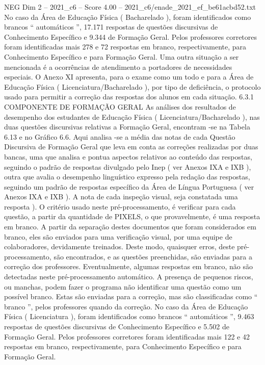 \begin{textsample}{NEG Dim 2 – 2021\_c6 – Score 4.00 – 2021\_c6/enade\_2021\_ef\_be61acbd52.txt}
No caso da Área de Educação Física ( Bacharelado ), foram identificados como brancos “ automáticos ”, 17.171 respostas de questões discursivas de Conhecimento Específico e 9.344 de Formação Geral.
Pelos professores corretores foram identificadas mais 278 e 72 respostas em branco, respectivamente, para Conhecimento Específico e para Formação Geral.
Uma outra situação a ser mencionada é a ocorrências de atendimento a portadores de necessidades especiais.
O Anexo XI apresenta, para o exame como um todo e para a Área de Educação Física ( Licenciatura/Bacharelado ), por tipo de deficiência, o protocolo usado para permitir a correção das respostas dos alunos em cada situação. 6.3.1 COMPONENTE DE FORMAÇÃO GERAL As análises dos resultados de desempenho dos estudantes de Educação Física ( Licenciatura/Bacharelado ), nas duas questões discursivas relativas a Formação Geral, encontram -se na Tabela 6.13 e no Gráfico 6.6.
Aqui analisa -se a média das notas de cada Questão Discursiva de Formação Geral que leva em conta as correções realizadas por duas bancas, uma que analisa e pontua aspectos relativos ao conteúdo das respostas, seguindo o padrão de respostas divulgado pelo Inep ( ver Anexos IXA e IXB ), outra que avalia o desempenho linguístico expresso pela redação das respostas, seguindo um padrão de respostas específico da Área de Língua Portuguesa ( ver Anexos IXA e IXB ).
A nota de cada inspeção visual, seja constatada uma resposta ).
O critério usado neste pré-processamento, é verificar para cada questão, a partir da quantidade de PIXELS, o que provavelmente, é uma resposta em branco.
A partir da separação destes documentos que foram considerados em branco, eles são enviados para uma verificação visual, por uma equipe de colaboradores, devidamente treinados.
Deste modo, quaisquer erros, deste pré-processamento, são encontrados, e as questões preenchidas, são enviadas para a correção dos professores.
Eventualmente, algumas respostas em branco, não são detectadas neste pré-processamento automático.
A presença de pequenos riscos, ou manchas, podem fazer o programa não identificar uma questão como um possível branco.
Estas são enviadas para a correção, mas são classificadas como “ branco ”, pelos professores quando da correção.
No caso da Área de Educação Física ( Licenciatura ), foram identificados como brancos “ automáticos ”, 9.463 respostas de questões discursivas de Conhecimento Específico e 5.502 de Formação Geral.
Pelos professores corretores foram identificadas mais 122 e 42 respostas em branco, respectivamente, para Conhecimento Específico e para Formação Geral.

\end{textsample}
